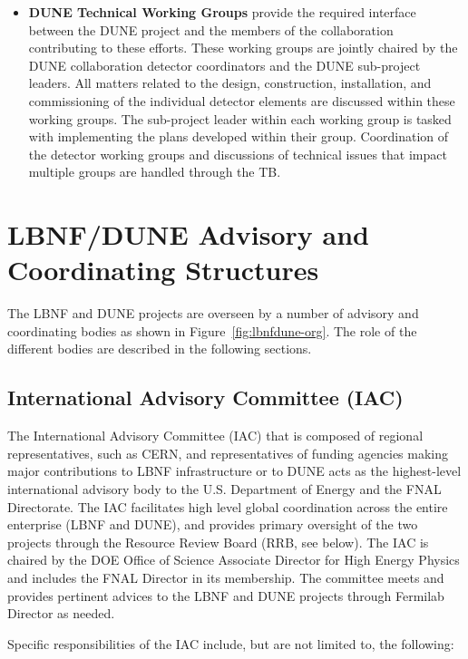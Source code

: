\begin{itemize}
  \item \textbf{DUNE Technical Working Groups} provide the required interface between the DUNE project and the members of the collaboration contributing to these efforts.  These working groups are jointly chaired by the DUNE collaboration detector coordinators and the DUNE sub-project leaders.  All matters related to the design, construction, installation, and commissioning of the individual detector elements are discussed within these working groups.  The sub-project leader within each working group is tasked with implementing the plans developed within their group.  Coordination of the detector working groups and discussions of technical issues that impact multiple groups are handled through the TB. 
\end{itemize}


\section{LBNF/DUNE Advisory and Coordinating Structures}
\label{sec:lbnf-dune-interface}

The LBNF and DUNE projects are overseen by a number of advisory and
coordinating bodies as shown in Figure~\ref{fig:lbnfdune-org}.
The role of the different bodies are described in the following sections.  

\subsection{International Advisory Committee (IAC) }

The International Advisory Committee (IAC) that is composed of
regional representatives, such as CERN, and representatives of
funding agencies making major contributions to LBNF infrastructure or to DUNE
acts as the highest-level international advisory body to the U.S.
Department of Energy and the FNAL Directorate. The IAC facilitates
high level global coordination across the entire enterprise (LBNF and DUNE),
and provides primary oversight of the two projects through
the Resource Review Board (RRB, see below). 
The IAC is chaired by the DOE Office of Science Associate Director
for High Energy Physics and includes the FNAL Director in its membership.  
The committee meets and provides pertinent advices to the LBNF and DUNE
projects through Fermilab Director as needed.  

Specific responsibilities of the IAC include, but are not limited to,
the following:


